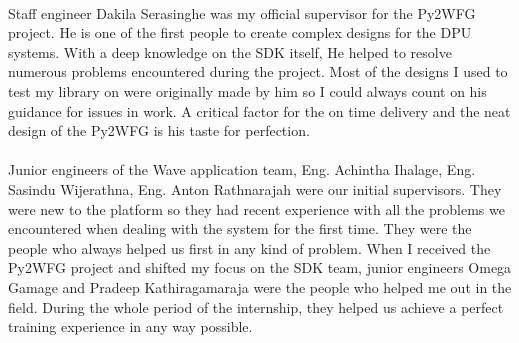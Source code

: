 \paragraph{}
Staff engineer Dakila Serasinghe was my official supervisor for the Py2WFG project. He is one of the first people to create complex designs for the DPU systems. With a deep knowledge on the SDK itself, He helped to resolve numerous problems encountered during the project. Most of the designs I used to test my library on were originally made by him so I could always count on his guidance for issues in work. A critical factor for the on time delivery and the neat design of the Py2WFG is his taste for perfection. 

\paragraph{}
Junior engineers of the Wave application team, Eng. Achintha Ihalage, Eng. Sasindu Wijerathna, Eng. Anton Rathnarajah were our initial supervisors. They were new to the platform so they had recent experience with all the problems we encountered when dealing with the system for the first time. They were the people who always helped us first in any kind of problem. When I received the Py2WFG project and shifted my focus on the SDK team, junior engineers Omega Gamage and Pradeep Kathiragamaraja were the people who helped me out in the field. During the whole period of the internship, they helped us achieve a perfect training experience in any way possible.